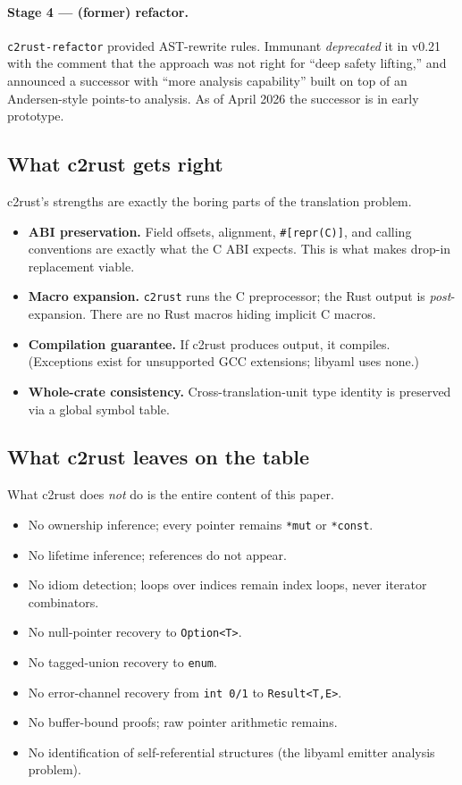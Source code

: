 \documentclass[12pt]{article}
\theoremstyle{definition}
\theoremstyle{remark}
\begin{document}
\paragraph{Stage 4 --- (former) refactor.}
\texttt{c2rust-refactor} provided AST-rewrite rules. Immunant
\emph{deprecated} it in v0.21 with the comment that the approach was
not right for ``deep safety lifting,'' and announced a successor with
``more analysis capability'' built on top of an Andersen-style
points-to analysis. As of April 2026 the successor is in early
prototype.

\subsection{What c2rust gets right}

c2rust's strengths are exactly the boring parts of the translation
problem.

\begin{itemize}
\item \textbf{ABI preservation.} Field offsets, alignment,
  \texttt{\#[repr(C)]}, and calling conventions are exactly what the C
  ABI expects. This is what makes drop-in replacement viable.
\item \textbf{Macro expansion.} \texttt{c2rust} runs the C preprocessor;
  the Rust output is \emph{post}-expansion. There are no Rust macros
  hiding implicit C macros.
\item \textbf{Compilation guarantee.} If c2rust produces output, it
  compiles. (Exceptions exist for unsupported GCC extensions; libyaml
  uses none.)
\item \textbf{Whole-crate consistency.} Cross-translation-unit type
  identity is preserved via a global symbol table.
\end{itemize}

\subsection{What c2rust leaves on the table}

What c2rust does \emph{not} do is the entire content of this paper.

\begin{itemize}
\item No ownership inference; every pointer remains \texttt{*mut} or
  \texttt{*const}.
\item No lifetime inference; references do not appear.
\item No idiom detection; loops over indices remain index loops, never
  iterator combinators.
\item No null-pointer recovery to \texttt{Option<T>}.
\item No tagged-union recovery to \texttt{enum}.
\item No error-channel recovery from \texttt{int 0/1} to
  \texttt{Result<T,E>}.
\item No buffer-bound proofs; raw pointer arithmetic remains.
\item No identification of self-referential structures (the libyaml
  emitter analysis problem).
\end{itemize}
\end{document}
